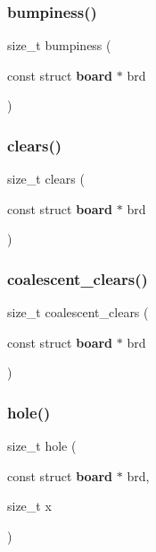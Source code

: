 \mbox{\label{tools_8h_a32300283b4df94743b9dae9d7bdaf119}} 
\subsubsection{bumpiness()}
{\footnotesize\ttfamily size\+\_\+t bumpiness (\begin{DoxyParamCaption}\item[{const struct \textbf{ board} $\ast$}]{brd }\end{DoxyParamCaption})\hspace{0.3cm}{\ttfamily [inline]}}

\mbox{\label{tools_8h_afd326c0778c693b0752754323b425bd2}} 
\subsubsection{clears()}
{\footnotesize\ttfamily size\+\_\+t clears (\begin{DoxyParamCaption}\item[{const struct \textbf{ board} $\ast$}]{brd }\end{DoxyParamCaption})\hspace{0.3cm}{\ttfamily [inline]}}

\mbox{\label{tools_8h_ac556c43db39f31aabe6297e22966a9f3}} 
\subsubsection{coalescent\+\_\+clears()}
{\footnotesize\ttfamily size\+\_\+t coalescent\+\_\+clears (\begin{DoxyParamCaption}\item[{const struct \textbf{ board} $\ast$}]{brd }\end{DoxyParamCaption})\hspace{0.3cm}{\ttfamily [inline]}}

\mbox{\label{tools_8h_a1415ca3c57c0a6fdb689276670d75c90}} 
\subsubsection{hole()}
{\footnotesize\ttfamily size\+\_\+t hole (\begin{DoxyParamCaption}\item[{const struct \textbf{ board} $\ast$}]{brd,  }\item[{size\+\_\+t}]{x }\end{DoxyParamCaption})\hspace{0.3cm}{\ttfamily [inline]}}

